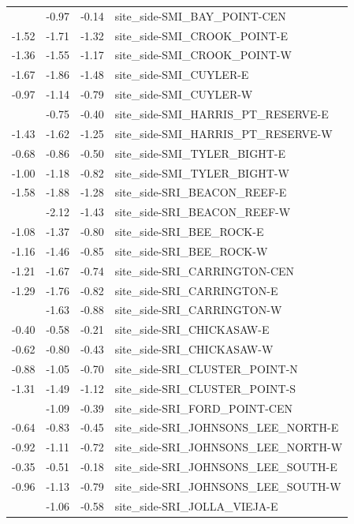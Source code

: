 \documentclass[]{article}
\begin{document}
\begin{longtable}[t]{rrrl}
\addlinespace
-0.56 & -0.97 & -0.14 & site\_side-SMI\_BAY\_POINT-CEN\\
-1.52 & -1.71 & -1.32 & site\_side-SMI\_CROOK\_POINT-E\\
-1.36 & -1.55 & -1.17 & site\_side-SMI\_CROOK\_POINT-W\\
-1.67 & -1.86 & -1.48 & site\_side-SMI\_CUYLER-E\\
-0.97 & -1.14 & -0.79 & site\_side-SMI\_CUYLER-W\\
\addlinespace
-0.57 & -0.75 & -0.40 & site\_side-SMI\_HARRIS\_PT\_RESERVE-E\\
-1.43 & -1.62 & -1.25 & site\_side-SMI\_HARRIS\_PT\_RESERVE-W\\
-0.68 & -0.86 & -0.50 & site\_side-SMI\_TYLER\_BIGHT-E\\
-1.00 & -1.18 & -0.82 & site\_side-SMI\_TYLER\_BIGHT-W\\
-1.58 & -1.88 & -1.28 & site\_side-SRI\_BEACON\_REEF-E\\
\addlinespace
-1.77 & -2.12 & -1.43 & site\_side-SRI\_BEACON\_REEF-W\\
-1.08 & -1.37 & -0.80 & site\_side-SRI\_BEE\_ROCK-E\\
-1.16 & -1.46 & -0.85 & site\_side-SRI\_BEE\_ROCK-W\\
-1.21 & -1.67 & -0.74 & site\_side-SRI\_CARRINGTON-CEN\\
-1.29 & -1.76 & -0.82 & site\_side-SRI\_CARRINGTON-E\\
\addlinespace
-1.26 & -1.63 & -0.88 & site\_side-SRI\_CARRINGTON-W\\
-0.40 & -0.58 & -0.21 & site\_side-SRI\_CHICKASAW-E\\
-0.62 & -0.80 & -0.43 & site\_side-SRI\_CHICKASAW-W\\
-0.88 & -1.05 & -0.70 & site\_side-SRI\_CLUSTER\_POINT-N\\
-1.31 & -1.49 & -1.12 & site\_side-SRI\_CLUSTER\_POINT-S\\
\addlinespace
-0.74 & -1.09 & -0.39 & site\_side-SRI\_FORD\_POINT-CEN\\
-0.64 & -0.83 & -0.45 & site\_side-SRI\_JOHNSONS\_LEE\_NORTH-E\\
-0.92 & -1.11 & -0.72 & site\_side-SRI\_JOHNSONS\_LEE\_NORTH-W\\
-0.35 & -0.51 & -0.18 & site\_side-SRI\_JOHNSONS\_LEE\_SOUTH-E\\
-0.96 & -1.13 & -0.79 & site\_side-SRI\_JOHNSONS\_LEE\_SOUTH-W\\
\addlinespace
-0.82 & -1.06 & -0.58 & site\_side-SRI\_JOLLA\_VIEJA-E\\

\end{longtable}
\end{document}
